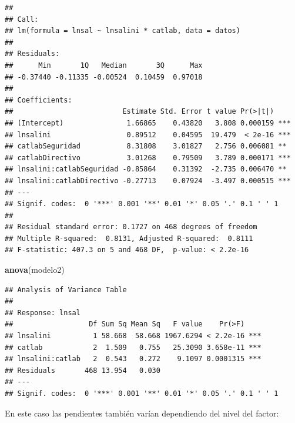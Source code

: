 \documentclass[]{book}
\newenvironment{Shaded}{\begin{snugshade}}{\end{snugshade}}
\newcommand{\KeywordTok}[1]{\textcolor[rgb]{0.13,0.29,0.53}{\textbf{#1}}}
\newcommand{\NormalTok}[1]{#1}
\begin{document}
\begin{verbatim}
## 
## Call:
## lm(formula = lnsal ~ lnsalini * catlab, data = datos)
## 
## Residuals:
##      Min       1Q   Median       3Q      Max 
## -0.37440 -0.11335 -0.00524  0.10459  0.97018 
## 
## Coefficients:
##                          Estimate Std. Error t value Pr(>|t|)    
## (Intercept)               1.66865    0.43820   3.808 0.000159 ***
## lnsalini                  0.89512    0.04595  19.479  < 2e-16 ***
## catlabSeguridad           8.31808    3.01827   2.756 0.006081 ** 
## catlabDirectivo           3.01268    0.79509   3.789 0.000171 ***
## lnsalini:catlabSeguridad -0.85864    0.31392  -2.735 0.006470 ** 
## lnsalini:catlabDirectivo -0.27713    0.07924  -3.497 0.000515 ***
## ---
## Signif. codes:  0 '***' 0.001 '**' 0.01 '*' 0.05 '.' 0.1 ' ' 1
## 
## Residual standard error: 0.1727 on 468 degrees of freedom
## Multiple R-squared:  0.8131, Adjusted R-squared:  0.8111 
## F-statistic: 407.3 on 5 and 468 DF,  p-value: < 2.2e-16
\end{verbatim}

\begin{Shaded}
\begin{Highlighting}[]
\KeywordTok{anova}\NormalTok{(modelo2)}
\end{Highlighting}
\end{Shaded}

\begin{verbatim}
## Analysis of Variance Table
## 
## Response: lnsal
##                  Df Sum Sq Mean Sq   F value    Pr(>F)    
## lnsalini          1 58.668  58.668 1967.6294 < 2.2e-16 ***
## catlab            2  1.509   0.755   25.3090 3.658e-11 ***
## lnsalini:catlab   2  0.543   0.272    9.1097 0.0001315 ***
## Residuals       468 13.954   0.030                        
## ---
## Signif. codes:  0 '***' 0.001 '**' 0.01 '*' 0.05 '.' 0.1 ' ' 1
\end{verbatim}

En este caso las pendientes también varían dependiendo del nivel del factor:
\end{document}
